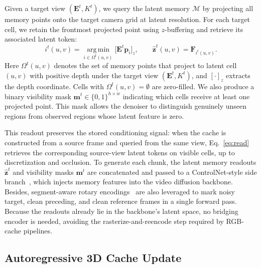  Given a target view $(\mathbf{E}^t, K^t)$, we query the latent memory
$\mathcal{M}$ by projecting all memory points onto the target camera grid
at latent resolution. For each target cell, we retain the frontmost
projected point using $z$-buffering and retrieve its associated latent
token:
\begin{equation}
i^t(u,v)
=
\operatorname*{arg\,min}_{i \in \Omega^t(u,v)}
\bigl[\mathbf{E}^t \mathbf{p}_i\bigr]_z,
\qquad
\hat{\mathbf{z}}^t(u,v)
=
\mathbf{F}_{i^t(u,v)} .
\label{eq:read}
\end{equation}
Here $\Omega^t(u,v)$ denotes the set of memory points that project to
latent cell $(u,v)$ with positive depth under the target view
$(\mathbf{E}^t,K^t)$, and $[\cdot]_z$ extracts the depth coordinate.
Cells with $\Omega^t(u,v)=\emptyset$ are zero-filled. We also produce a
binary visibility mask $\mathbf{m}^t\in\{0,1\}^{h\times w}$ indicating
which cells receive at least one projected point. This mask allows the
denoiser to distinguish genuinely unseen regions from observed regions
whose latent feature is zero. 

This readout preserves the stored conditioning signal: when the cache is
constructed from a source frame and queried from the same view,
Eq.~\ref{eq:read} retrieves the corresponding source-view latent tokens on
visible cells, up to discretization and occlusion. 
To generate each chunk, the latent memory readouts $\hat{\mathbf{z}}^t$ and visibility masks $\mathbf{m}^t$ are concatenated and passed to a ControlNet-style side branch~\cite{zhang2023adding}, which injects memory features into the video diffusion backbone. 
Besides, segment-aware rotary encodings~\cite{su2024roformer} are also leveraged to mark noisy target, clean preceding, and clean reference frames in a single forward pass. 
Because the readouts already lie in the backbone's latent space, no bridging encoder is needed, avoiding the rasterize-and-reencode step required by RGB-cache pipelines.




\subsection{Autoregressive 3D Cache Update}
\label{sec:method:update}

